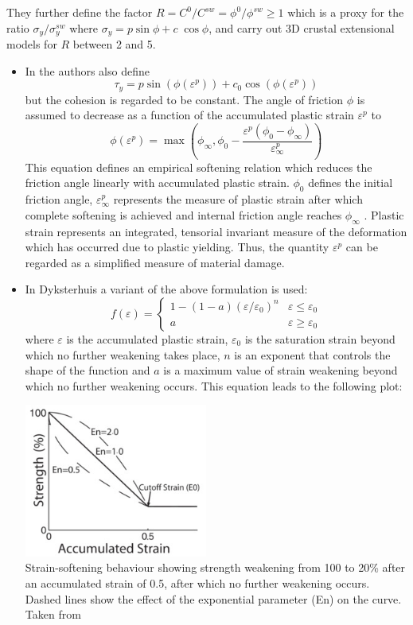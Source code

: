 They further define the factor $R=C^0/C^{sw}=\phi^0/\phi^{sw}\geq 1$ which is a proxy
for the ratio $\sigma_y/\sigma_y^{sw}$ where $\sigma_y=p \sin\phi + c \; \cos \phi$, 
and carry out 3D crustal extensional models for $R$ between 2 and 5. 


\begin{itemize}
\item In \cite{lemh17} the authors also define 
\[
\tau_y = p \sin (\phi(\varepsilon^p))  + c_0 \cos(\phi(\varepsilon^p))
\]
but the cohesion is regarded to be constant. 
The angle of friction $\phi$ is assumed to decrease as a function of the accumulated plastic
strain $\varepsilon^p$ to
\[
\phi(\varepsilon^p) 
=
\max \left(
\phi_\infty , \phi_0 - \frac{\varepsilon^p (\phi_0-\phi_\infty)}{\varepsilon^p_\infty}
\right)
\]
This equation defines an empirical softening relation which reduces the
friction angle linearly with accumulated plastic strain.
$\phi_0$ defines the initial friction angle, $\varepsilon^p_\infty$
represents the measure of plastic strain after which complete softening is achieved and internal
friction angle reaches $\phi_\infty$ . Plastic strain represents an integrated,
tensorial invariant measure of the deformation which has occurred
due to plastic yielding. Thus, the quantity $\varepsilon^p$ can be regarded as
a simplified measure of material damage. 


\item In Dyksterhuis \etal \cite{dyrm07} a variant of the above formulation is used:
\[
f(\varepsilon)=
\left\{
\begin{array}{cc} 
1-(1-a)(\varepsilon/\varepsilon_0)^n & \varepsilon \leq \varepsilon_0 \\
a &  \varepsilon \geq \varepsilon_0 
\end{array}
\right.
\]
where $\varepsilon$ is the accumulated plastic strain, $\varepsilon_0$ is the
saturation strain beyond which no further weakening
takes place, $n$ is an exponent that controls the shape
of the function and $a$ is a maximum value of strain
weakening beyond which no further weakening
occurs. This equation leads to the following plot:

\begin{center}
\includegraphics[width=6cm]{images/strainweakening/dyrm07}\\
{\tiny Strain-softening behaviour showing strength weakening from 100 to 20\% 
after an accumulated strain of 0.5, after which no further weakening occurs. 
Dashed lines show the effect of the exponential parameter
(En) on the curve. Taken from \cite{dyrm07}}
\end{center}


\end{itemize}
